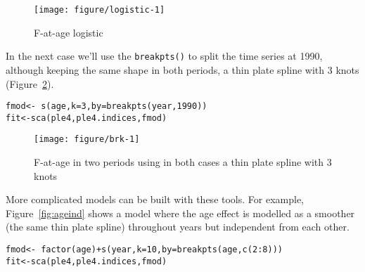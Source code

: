 \documentclass[a4paper,english,10pt]{article}\usepackage[]{graphicx}\usepackage[]{color}
\makeatletter
\def\maxwidth{ %
  \ifdim\Gin@nat@width>\linewidth
    \linewidth
  \else
    \Gin@nat@width
  \fi
}
\newcommand{\hlnum}[1]{\textcolor[rgb]{0.2,0.2,0.2}{#1}}%
\newcommand{\hlopt}[1]{\textcolor[rgb]{0.2,0.2,0.2}{#1}}%
\newcommand{\hlstd}[1]{\textcolor[rgb]{0,0,0}{#1}}%
\newcommand{\hlkwb}[1]{\textcolor[rgb]{0.361,0.506,0.596}{#1}}%
\newcommand{\hlkwc}[1]{\textcolor[rgb]{0.361,0.506,0.596}{#1}}%
\newcommand{\hlkwd}[1]{\textcolor[rgb]{0.361,0.506,0.596}{#1}}%
\newenvironment{kframe}{%
 \def\at@end@of@kframe{}%
 \ifinner\ifhmode%
  \def\at@end@of@kframe{\end{minipage}}%
  \begin{minipage}{\columnwidth}%
 \fi\fi%
 \def\FrameCommand##1{\hskip\@totalleftmargin \hskip-\fboxsep
 \colorbox{shadecolor}{##1}\hskip-\fboxsep
     \hskip-\linewidth \hskip-\@totalleftmargin \hskip\columnwidth}%
 \MakeFramed {\advance\hsize-\width
   \@totalleftmargin\z@ \linewidth\hsize
   \@setminipage}}%
 {\par\unskip\endMakeFramed%
 \at@end@of@kframe}
\newenvironment{knitrout}{}{} %
\newcommand{\code}[1]{{\texttt{#1}}}
\makeatother
\begin{document}
\begin{knitrout}
\color{fgcolor}\begin{figure}[H]

{\centering \texttt{[image: figure/logistic-1]} 

}

\caption[F-at-age logistic]{F-at-age logistic\label{fig:logistic}}
\end{figure}


\end{knitrout}

In the next case we'll use the \code{breakpts()} to split the time series at 1990, although keeping the same shape in both periods, a thin plate spline with 3 knots (Figure~\ref{fig:brk}).

\begin{knitrout}
\color{fgcolor}\begin{kframe}
\begin{alltt}
\hlstd{fmod} \hlkwb{<-} \hlopt{~}\hlkwd{s}\hlstd{(age,} \hlkwc{k} \hlstd{=} \hlnum{3}\hlstd{,} \hlkwc{by} \hlstd{=} \hlkwd{breakpts}\hlstd{(year,} \hlnum{1990}\hlstd{))}
\hlstd{fit} \hlkwb{<-} \hlkwd{sca}\hlstd{(ple4, ple4.indices, fmod)}
\end{alltt}
\end{kframe}
\end{knitrout}

\begin{knitrout}
\color{fgcolor}\begin{figure}[H]

{\centering \texttt{[image: figure/brk-1]} 

}

\caption[F-at-age in two periods using in both cases a thin plate spline with 3 knots]{F-at-age in two periods using in both cases a thin plate spline with 3 knots\label{fig:brk}}
\end{figure}


\end{knitrout}

More complicated models can be built with these tools. For example, Figure~\ref{fig:ageind} shows a model where the age effect is modelled as a smoother (the same thin plate spline) throughout years but independent from each other.

\begin{knitrout}
\color{fgcolor}\begin{kframe}
\begin{alltt}
\hlstd{fmod} \hlkwb{<-} \hlopt{~} \hlkwd{factor}\hlstd{(age)} \hlopt{+} \hlkwd{s}\hlstd{(year,} \hlkwc{k}\hlstd{=}\hlnum{10}\hlstd{,} \hlkwc{by} \hlstd{=} \hlkwd{breakpts}\hlstd{(age,} \hlkwd{c}\hlstd{(}\hlnum{2}\hlopt{:}\hlnum{8}\hlstd{)))}
\hlstd{fit} \hlkwb{<-} \hlkwd{sca}\hlstd{(ple4, ple4.indices, fmod)}
\end{alltt}
\end{kframe}
\end{knitrout}
\end{document}
